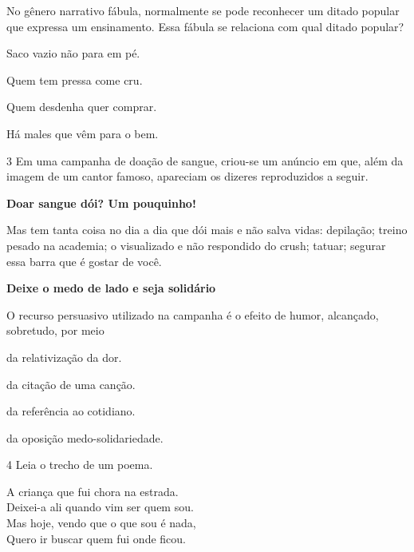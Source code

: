 No gênero narrativo fábula, normalmente se pode reconhecer um ditado
popular que expressa um ensinamento. Essa fábula se relaciona com qual ditado popular?

\begin{escolha}
\item Saco vazio não para em pé.

\item Quem tem pressa come cru.

\item Quem desdenha quer comprar.

\item Há males que vêm para o bem.
\end{escolha}

\num{3} Em uma campanha de doação de sangue, criou-se um anúncio em que, além da imagem de 
um cantor famoso, apareciam os dizeres reproduzidos a seguir.

\begin{center}
\begin{myquote}
\textbf{Doar sangue dói? Um pouquinho!}

Mas tem tanta coisa no dia a dia que dói mais e não salva vidas: depilação; treino pesado na academia; o 
visualizado e não respondido do crush; tatuar; segurar essa barra que é gostar de você.

\textbf{Deixe o medo de lado e seja solidário}
\end{myquote}
\end{center}


O recurso persuasivo utilizado na campanha é o efeito de humor, alcançado, sobretudo, por meio

\begin{escolha}
\item da relativização da dor.
\item da citação de uma canção.
\item da referência ao cotidiano.
\item da oposição medo-solidariedade.
\end{escolha}

\num{4} Leia o trecho de um poema.

\begin{myquote}
A criança que fui chora na estrada.\\
Deixei-a ali quando vim ser quem sou.\\
Mas hoje, vendo que o que sou é nada,\\
Quero ir buscar quem fui onde ficou.

\end{myquote}

